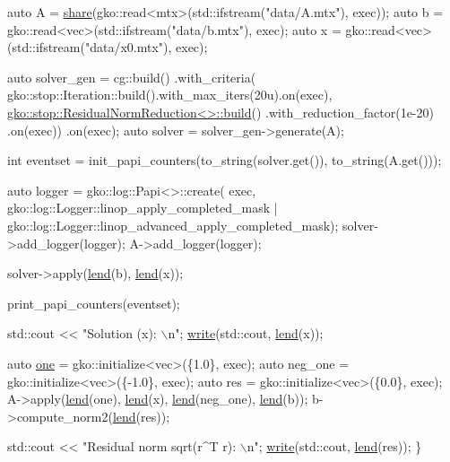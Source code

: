 \begin{DoxyCodeInclude}
    \textcolor{keyword}{auto} A = \hyperlink{namespacegko_a3ce296f73db0ff398bdea6009a3a5c58}{share}(gko::read<mtx>(std::ifstream(\textcolor{stringliteral}{"data/A.mtx"}), exec));
    \textcolor{keyword}{auto} b = gko::read<vec>(std::ifstream(\textcolor{stringliteral}{"data/b.mtx"}), exec);
    \textcolor{keyword}{auto} x = gko::read<vec>(std::ifstream(\textcolor{stringliteral}{"data/x0.mtx"}), exec);

    \textcolor{keyword}{auto} solver\_gen =
        cg::build()
            .with\_criteria(
                gko::stop::Iteration::build().with\_max\_iters(20u).on(exec),
                \hyperlink{classgko_1_1stop_1_1ResidualNormReduction}{gko::stop::ResidualNormReduction<>::build}()
                    .with\_reduction\_factor(1e-20)
                    .on(exec))
            .on(exec);
    \textcolor{keyword}{auto} solver = solver\_gen->generate(A);

    \textcolor{keywordtype}{int} eventset =
        init\_papi\_counters(to\_string(solver.get()), to\_string(A.get()));


    \textcolor{keyword}{auto} logger = gko::log::Papi<>::create(
        exec, gko::log::Logger::linop\_apply\_completed\_mask |
                  gko::log::Logger::linop\_advanced\_apply\_completed\_mask);
    solver->add\_logger(logger);
    A->add\_logger(logger);

    solver->apply(\hyperlink{namespacegko_aa8cb4876b72e5e1036ea9575443c439b}{lend}(b), \hyperlink{namespacegko_aa8cb4876b72e5e1036ea9575443c439b}{lend}(x));


    print\_papi\_counters(eventset);

    std::cout << \textcolor{stringliteral}{"Solution (x): \(\backslash\)n"};
    \hyperlink{namespacegko_a859dc47a462721d83728d91ab7fa2148}{write}(std::cout, \hyperlink{namespacegko_aa8cb4876b72e5e1036ea9575443c439b}{lend}(x));

    \textcolor{keyword}{auto} \hyperlink{namespacegko_a0059e27f8f4bc348ff65c1e60caf47c8}{one} = gko::initialize<vec>(\{1.0\}, exec);
    \textcolor{keyword}{auto} neg\_one = gko::initialize<vec>(\{-1.0\}, exec);
    \textcolor{keyword}{auto} res = gko::initialize<vec>(\{0.0\}, exec);
    A->apply(\hyperlink{namespacegko_aa8cb4876b72e5e1036ea9575443c439b}{lend}(one), \hyperlink{namespacegko_aa8cb4876b72e5e1036ea9575443c439b}{lend}(x), \hyperlink{namespacegko_aa8cb4876b72e5e1036ea9575443c439b}{lend}(neg\_one), \hyperlink{namespacegko_aa8cb4876b72e5e1036ea9575443c439b}{lend}(b));
    b->compute\_norm2(\hyperlink{namespacegko_aa8cb4876b72e5e1036ea9575443c439b}{lend}(res));

    std::cout << \textcolor{stringliteral}{"Residual norm sqrt(r^T r): \(\backslash\)n"};
    \hyperlink{namespacegko_a859dc47a462721d83728d91ab7fa2148}{write}(std::cout, \hyperlink{namespacegko_aa8cb4876b72e5e1036ea9575443c439b}{lend}(res));
\}
\end{DoxyCodeInclude}
 